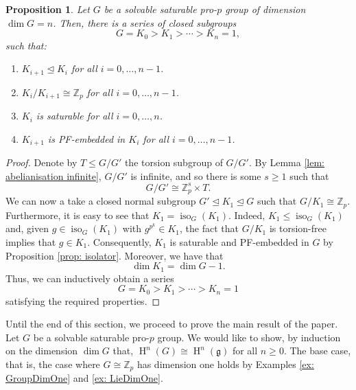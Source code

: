 \documentclass[11pt]{article}
\newcommand{\Z}{\mathbb{Z}}
\newcommand{\Zp}{\mathbb{Z}_p}
\newcommand{\g}{\mathfrak{g}}
\DeclareMathOperator{\HH}{H}
\newcommand{\isom}{\cong}
\newcommand{\normaleq}{\unlhd}
\DeclareMathOperator{\iso}{iso}
\theoremstyle{plain}
\newtheorem{proposition}[lemma]{Proposition}
\theoremstyle{definition}
\begin{document}
	\begin{proposition}\label{prop: subgroup series}
		Let $G$ be a solvable saturable pro-$p$ group of dimension $\dim G=n$. Then, there is a series of closed subgroups 
		\begin{displaymath}
			G=K_0> K_1 > \dotsb > K_n=1,
		\end{displaymath}
		such that:
		\begin{enumerate}
			\item[{\bf i.}] $K_{i+1}\normaleq K_i$ for all $i=0,\dotsc,n-1$.
			
			\item[{\bf ii.}] $K_i/K_{i+1}\isom \Zp$ for all $i=0,\dotsc,n-1$.
			
			\item[{\bf iii.}] $K_i$ is saturable for all $i=0,\dotsc,n$.
			
			\item[{\bf iv.}] $K_{i+1}$ is PF-embedded in $K_i$ for all $i=0,\dotsc,n-1$.
		\end{enumerate}
	\end{proposition}
	\begin{proof}
		Denote by $T\leq G/G'$ the torsion subgroup of $G/G'$. By Lemma \ref{lem: abelianisation infinite}, $G/G'$ is infinite, and so there is some $s\geq 1$ such that 
		\begin{displaymath}
			G/G'\isom \Zp^s \times T.
		\end{displaymath}
		We can now a take a closed normal subgroup $G'\normaleq K_1\normaleq G$ such that $G/K_1\isom \Zp$. Furthermore, 
		 it is easy to see that $K_1=\iso_G(K_1)$. Indeed, $K_1\leq \iso_G(K_1)$ and, given $g\in \iso_G(K_1)$ with $g^{p^k}\in K_1$, the fact that $G/K_1$ is torsion-free implies that $g\in K_1$. Consequently, $K_1$ is saturable and PF-embedded in $G$ by Proposition \ref{prop: isolator}. Moreover, we have that 
		\begin{displaymath}
			\dim K_1 = \dim G -1.
		\end{displaymath}
	Thus, we can inductively obtain a series
	\begin{displaymath}
		G=K_0> K_1 > \dotsb > K_n=1
	\end{displaymath}
	satisfying the required properties.
	\end{proof}

	
	Until the end of this section, we proceed to prove the main result of the paper. Let $G$ be a  solvable saturable pro-$p$ group. We would like to show, by induction on the dimension $\dim G$ that, $\HH^{n}(G)\isom \HH^{n}(\g)$ for all $n\geq 0$. The base case, that is, the case where $G\cong \Z_p$ has dimension one holds by Examples \ref{ex: GroupDimOne} and \ref{ex: LieDimOne}. 
	
\end{document}
